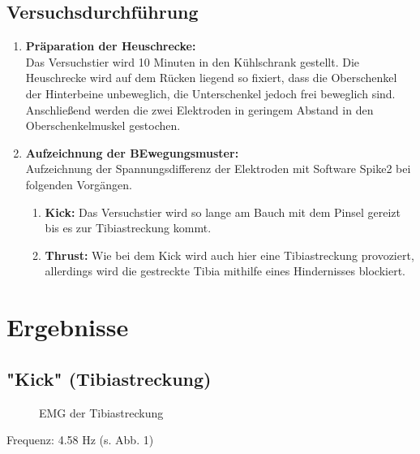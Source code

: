\subsection{Versuchsdurchführung}
\begin{enumerate}
\item \textbf{Präparation der Heuschrecke:}\\ Das Versuchstier wird 10 Minuten in den Kühlschrank gestellt. Die Heuschrecke wird auf dem Rücken liegend so fixiert, dass die Oberschenkel der Hinterbeine unbeweglich, die Unterschenkel jedoch frei beweglich sind. Anschließend werden die zwei Elektroden in geringem Abstand in den Oberschenkelmuskel gestochen. 
\item \textbf{Aufzeichnung der BEwegungsmuster:}\\
Aufzeichnung der Spannungsdifferenz der Elektroden mit Software Spike2 bei folgenden Vorgängen.
\begin{enumerate}
\item \textbf{Kick:} Das Versuchstier wird so lange am Bauch mit dem Pinsel gereizt bis es zur Tibiastreckung kommt. 
\item \textbf{Thrust:} Wie bei dem Kick wird auch hier eine Tibiastreckung provoziert, allerdings wird die gestreckte Tibia mithilfe eines Hindernisses blockiert. 
\end{enumerate}
\end{enumerate}

\section{Ergebnisse}
\subsection{"{}Kick"{} (Tibiastreckung)}
\begin{figure}[H]
\caption{EMG der Tibiastreckung}
\label{kick}
\end{figure}
Frequenz: 4.58 Hz (s. Abb. 1)

